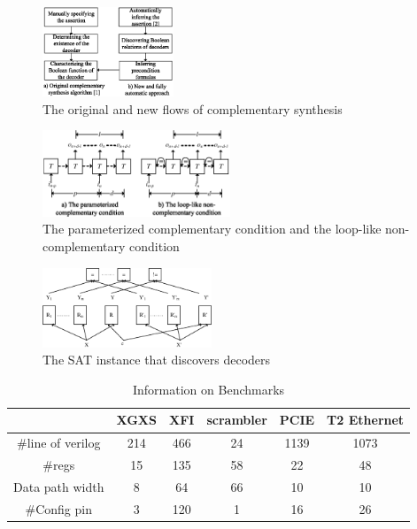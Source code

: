 \documentclass[journal]{IEEEtran}
\begin{document}
\begin{figure}[t]
\begin{center}
\includegraphics[width=0.35\textwidth]{flow}
\end{center}
\caption{The original and new flows of complementary synthesis}
  \label{flow}
\end{figure}


\begin{figure}[t]
\begin{center}
\includegraphics[width=0.5\textwidth]{pcln}
\end{center}
\caption{The parameterized complementary condition and the loop-like non-complementary condition}
  \label{fig_pcln}
\end{figure}



\begin{figure}[t]
\centering
\includegraphics[width=0.45\textwidth]{fdtest}
\caption{The SAT instance that discovers decoders}
\label{fig_fdtest}
\end{figure}

\begin{table}[t]
\centering
\caption{Information on Benchmarks}
\begin{tabular}{|c|c|c|c|c|c|}
\hline
&XGXS&XFI&scrambler&PCIE&T2 Ethernet\\\hline
\#line of verilog&214&466&24&1139&1073\\\hline
\#regs&15&135&58&22&48\\\hline
Data path width&8&64&66&10&10\\\hline
\#Config pin                              &3        &120       &1         &16      &26\\\hline
\end{tabular}\label{tab_benchmark}
\end{table}
\end{document}

